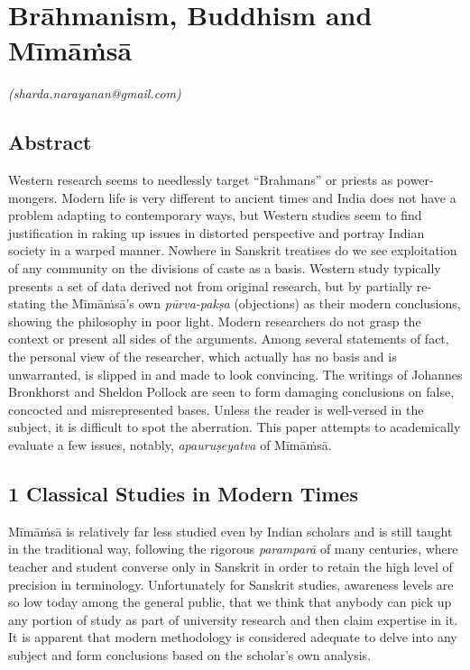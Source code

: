 
\chapter{Brāhmanism, Buddhism and Mīmāṁsā}\label{chapter6}


\begin{flushright}
\textit{(sharda.narayanan@gmail.com)}
\end{flushright}


\vspace{.2cm}

\section*{Abstract}

Western research seems to needlessly target “Brahmans” or priests as power-mongers. Modern life is very different to ancient times and India does not have a problem adapting to contemporary ways, but Western studies seem to find justification in raking up issues in distorted perspective and portray Indian society in a warped manner. Nowhere in Sanskrit treatises do we see exploitation of any community on the divisions of caste as a basis. Western study typically presents a set of data derived not from original research, but by partially re-stating the Mīmāṁsā’s own \textit{pūrva-pakṣa} (objections) as their modern conclusions, showing the philosophy in poor light. Modern researchers do not grasp the context or present all sides of the arguments. Among several statements of fact, the personal view of the researcher, which actually has no basis and is unwarranted, is slipped in and made to look convincing. The writings of Johannes Bronkhorst and Sheldon Pollock are seen to form damaging conclusions on false, concocted and misrepresented bases. Unless the reader is well-versed in the subject, it is difficult to spot the aberration. This paper attempts to academically evaluate a few issues, notably, \textit{apauruṣeyatva} of Mīmāṁsā.

\vspace{-.3cm}

\section*{1 Classical Studies in Modern Times}

Mīmāṁsā is relatively far less studied even by Indian scholars and is still taught in the traditional way, following the rigorous \textit{paramparā} of many centuries, where teacher and student converse only in Sanskrit in order to retain the high level of precision in terminology. Unfortunately for Sanskrit studies, awareness levels are so low today among the general public, that we think that anybody can pick up any portion of study as part of university research and then claim expertise in it. It is apparent that modern methodology is considered adequate to delve into any subject and form conclusions based on the scholar’s own analysis.

